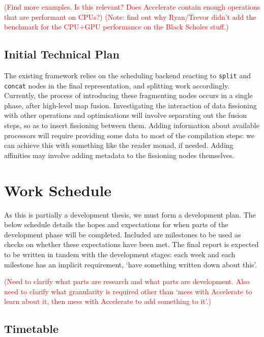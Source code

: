 \documentclass[a4paper,12pt]{article}
\newcommand{\red}[1]{\textcolor{red}{#1}}
\newcommand{\icf}[1]{\mbox{\texttt{#1}}} %
\begin{document}
\red{(Find more examples. Is this relevant? Does Accelerate contain enough operations that are performant on CPUs?)}
\red{(Note: find out why Ryan/Trevor didn't add the benchmark for the CPU+GPU performance on the Black Scholes stuff.)}

\subsection{Initial Technical Plan}
The existing framework relies on the scheduling backend reacting to \icf{split} and \icf{concat} nodes in the final representation, and splitting work accordingly.
Currently, the process of introducing these fragmenting nodes occurs in a single phase, after high-level map fusion.
Investigating the interaction of data fissioning with other operations and optimisations will involve separating out the fusion steps, so as to insert fissioning between them.
Adding information about available processors will require providing some data to most of the compilation steps: we can achieve this with something like the reader monad, if needed.
Adding affinities may involve adding metadata to the fissioning nodes themselves.

\section{Work Schedule}
As this is partially a development thesis, we must form a development plan.
The below schedule details the hopes and expectations for when parts of the development phase will be completed.
Included are milestones to be used as checks on whether these expectations have been met.
The final report is expected to be written in tandem with the development stages: each week and each milestone has an implicit requirement, `have something written down about this'.

\red{(Need to clarify what parts are research and what parts are development. Also need to clarify what granularity is required other than `mess with Accelerate to learn about it, then mess with Accelerate to add something to it'.)}

\subsection{Timetable}
\end{document}
